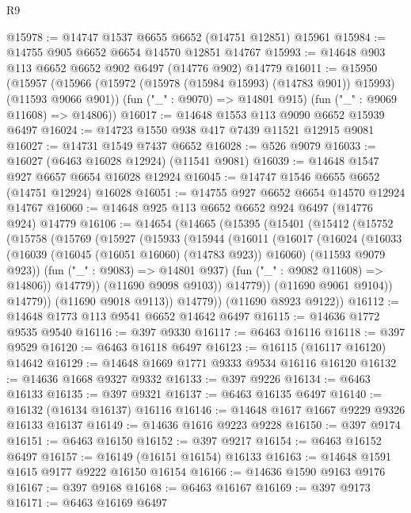 \begin{lexlean}{R9}
\begin{coremodule}
{{{{{{{{{{{{{{{{{{{{{{{{{{{{{{{{{{{{{{{{{{{{{{{{{{{{{{{{{{{{{{{{{{{{{{{{{{{{{{{{{{{{@15978 := @14747 @1537 @6655 @6652 (@14751 @12851) @15961
@15984 := @14755 @905 @6652 @6654 @14570 @12851 @14767
@15993 := @14648 @903 @113 @6652 @6652 @902 @6497 (@14776 @902) @14779
@16011 := @15950
    (@15957
      (@15966 (@15972 (@15978 (@15984 @15993) (@14783 @901)) @15993) (@11593 @9066 @901))
      (fun ("_" : @9070) => @14801 @915)
      (fun ("_" : @9069 @11608) => @14806))
@16017 := @14648 @1553 @113 @9090 @6652 @15939 @6497
@16024 := @14723 @1550 @938 @417 @7439 @11521 @12915 @9081
@16027 := @14731 @1549 @7437 @6652
@16028 := @526 @9079
@16033 := @16027 (@6463 @16028 @12924) (@11541 @9081)
@16039 := @14648 @1547 @927 @6657 @6654 @16028 @12924
@16045 := @14747 @1546 @6655 @6652 (@14751 @12924) @16028
@16051 := @14755 @927 @6652 @6654 @14570 @12924 @14767
@16060 := @14648 @925 @113 @6652 @6652 @924 @6497 (@14776 @924) @14779
@16106 := @14654
    (@14665
      (@15395
        (@15401
          (@15412
            (@15752
              (@15758
                (@15769
                  (@15927
                    (@15933
                      (@15944
                        (@16011
                          (@16017
                            (@16024
                              (@16033
                                (@16039 (@16045 (@16051 @16060) (@14783 @923)) @16060)
                                (@11593 @9079 @923))
                              (fun ("_" : @9083) => @14801 @937)
                              (fun ("_" : @9082 @11608) => @14806))
                            @14779))
                        (@11690 @9098 @9103))
                      @14779))
                  (@11690 @9061 @9104))
                @14779))
            (@11690 @9018 @9113))
          @14779))
      (@11690 @8923 @9122))
@16112 := @14648 @1773 @113 @9541 @6652 @14642 @6497
@16115 := @14636 @1772 @9535 @9540
@16116 := @397 @9330
@16117 := @6463 @16116
@16118 := @397 @9529
@16120 := @6463 @16118 @6497
@16123 := @16115 (@16117 @16120) @14642
@16129 := @14648 @1669 @1771 @9333 @9534 @16116 @16120
@16132 := @14636 @1668 @9327 @9332
@16133 := @397 @9226
@16134 := @6463 @16133
@16135 := @397 @9321
@16137 := @6463 @16135 @6497
@16140 := @16132 (@16134 @16137) @16116
@16146 := @14648 @1617 @1667 @9229 @9326 @16133 @16137
@16149 := @14636 @1616 @9223 @9228
@16150 := @397 @9174
@16151 := @6463 @16150
@16152 := @397 @9217
@16154 := @6463 @16152 @6497
@16157 := @16149 (@16151 @16154) @16133
@16163 := @14648 @1591 @1615 @9177 @9222 @16150 @16154
@16166 := @14636 @1590 @9163 @9176
@16167 := @397 @9168
@16168 := @6463 @16167
@16169 := @397 @9173
@16171 := @6463 @16169 @6497
}}}}}}}}}}}}}}}}}}}}}}}}}}}}}}}}}}}}}}}}}}}}}}}}}}}}}}}}}}}}}}}}}}}}}}}}}}}}}}}}}}}}
\end{coremodule}
\end{lexlean}
